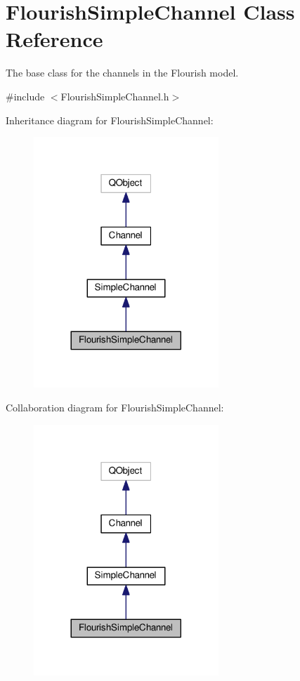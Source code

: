 \hypertarget{classFlourishSimpleChannel}{}\section{Flourish\+Simple\+Channel Class Reference}
\label{classFlourishSimpleChannel}


The base class for the channels in the Flourish model.  




{\ttfamily \#include $<$Flourish\+Simple\+Channel.\+h$>$}



Inheritance diagram for Flourish\+Simple\+Channel\+:
\nopagebreak
\begin{figure}[H]
\begin{center}
\leavevmode
\includegraphics[width=197pt]{classFlourishSimpleChannel__inherit__graph}
\end{center}
\end{figure}


Collaboration diagram for Flourish\+Simple\+Channel\+:
\nopagebreak
\begin{figure}[H]
\begin{center}
\leavevmode
\includegraphics[width=197pt]{classFlourishSimpleChannel__coll__graph}
\end{center}
\end{figure}
